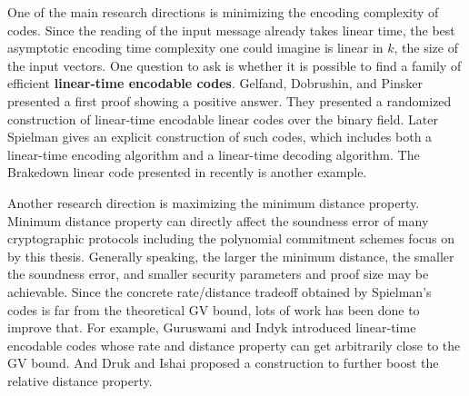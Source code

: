 One of the main research directions is minimizing the encoding complexity
of codes. Since the reading of the input message already takes linear time, the best asymptotic encoding time complexity one could imagine is linear in $k$, the size of the input vectors. One question to ask is whether it is possible to find a family of efficient \textbf{linear-time encodable codes}. Gelfand, Dobrushin, and Pinsker \cite{gelfand1973complexity} presented a first proof showing a positive answer. They presented a randomized construction of linear-time encodable linear codes over the binary field. Later Spielman \cite{DBLP:conf/stoc/Spielman95} gives an explicit construction of such codes, which includes both a linear-time encoding algorithm and a linear-time decoding algorithm. The Brakedown linear code presented in \cite{brakedown} recently is another example.

Another research direction is maximizing the minimum distance property. Minimum distance property can directly affect the soundness error of many cryptographic protocols including the polynomial commitment schemes focus on by this thesis. Generally speaking, the larger the minimum distance, the smaller the soundness error, and smaller security parameters and proof size may be achievable. Since the concrete rate/distance tradeoff obtained by Spielman’s codes is far from the theoretical GV bound, lots of work has been done to improve that. For example, Guruswami and Indyk \cite{DBLP:journals/tit/GuruswamiI05} introduced linear-time encodable codes whose rate and distance property can get arbitrarily close to the GV bound. And Druk and Ishai \cite{10.1145/2554797.2554815} proposed a construction to further boost the relative distance property. 
